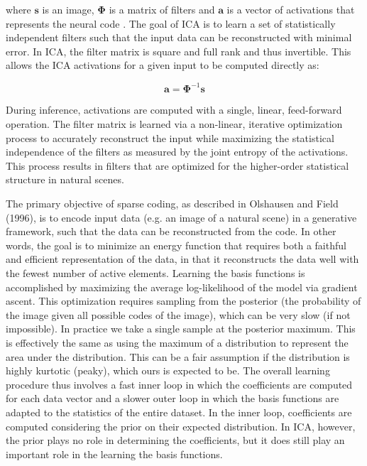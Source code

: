 where $\mathbf{s}$ is an image, $\mathbf{\Phi}$ is a matrix of filters and $\mathbf{a}$ is a vector of activations that represents the neural code \cite{bell:1997gx}. The goal of ICA is to learn a set of statistically independent filters such that the input data can be reconstructed with minimal error. In ICA, the filter matrix is square and full rank and thus invertible. This allows the ICA activations for a given input to be computed directly as:

\begin{equation}
\mathbf{\hat{a}} = \mathbf{\Phi}^{-1}\mathbf{s}
\end{equation}

During inference, activations are computed with a single, linear, feed-forward operation. The filter matrix is learned via a non-linear, iterative optimization process to accurately reconstruct the input while maximizing the statistical independence of the filters as measured by the joint entropy of the activations. This process results in filters that are optimized for the higher-order statistical structure in natural scenes.

The primary objective of sparse coding, as described in Olshausen and Field (1996), is to encode input data (e.g. an image of a natural scene) in a generative framework, such that the data can be reconstructed from the code. In other words, the goal is to minimize an energy function that requires both a faithful and efficient representation of the data, in that it reconstructs the data well with the fewest number of active elements. Learning the basis functions is accomplished by maximizing the average log-likelihood of the model via gradient ascent. This optimization requires sampling from the posterior (the probability of the image given all possible codes of the image), which can be very slow (if not impossible). In practice we take a single sample at the posterior maximum. This is effectively the same as using the maximum of a distribution to represent the area under the distribution. This can be a fair assumption if the distribution is highly kurtotic (peaky), which ours is expected to be. The overall learning procedure thus involves a fast inner loop in which the coefficients are computed for each data vector and a slower outer loop in which the basis functions are adapted to the statistics of the entire dataset. In the inner loop, coefficients are computed considering the prior on their expected distribution. In ICA, however, the prior plays no role in determining the coefficients, but it does still play an important role in the learning the basis functions.

